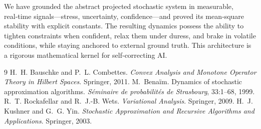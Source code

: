 \documentclass{article}
\begin{document}
We have grounded the abstract projected stochastic system in measurable, real‑time signals—stress, uncertainty, confidence—and proved its mean‑square stability with explicit constants. The resulting dynamics possess the ability to tighten constraints when confident, relax them under duress, and brake in volatile conditions, while staying anchored to external ground truth. This architecture is a rigorous mathematical kernel for self‑correcting AI.

\begin{thebibliography}{9}
H.~H. Bauschke and P.~L. Combettes.
\newblock \emph{Convex Analysis and Monotone Operator Theory in Hilbert Spaces}.
\newblock Springer, 2011.
M.~Bena\"im.
\newblock Dynamics of stochastic approximation algorithms.
\newblock \emph{S\'eminaire de probabilit\'es de Strasbourg}, 33:1--68, 1999.
R.~T. Rockafellar and R.~J.-B. Wets.
\newblock \emph{Variational Analysis}.
\newblock Springer, 2009.
H.~J. Kushner and G.~G. Yin.
\newblock \emph{Stochastic Approximation and Recursive Algorithms and Applications}.
\newblock Springer, 2003.
\end{thebibliography}
\end{document}
